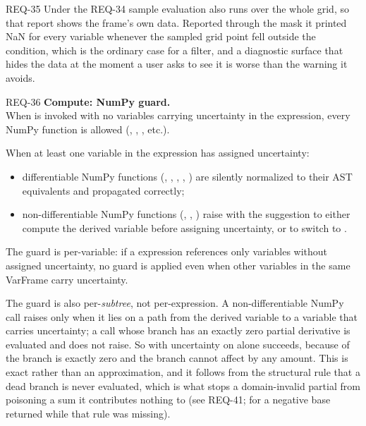 \begin{reqbox}{REQ-35}{\stable}
Under  the REQ-34 sample evaluation also runs over the
whole grid, so that report shows the frame's own data. Reported through
the mask it printed NaN for every variable whenever the sampled grid
point fell outside the condition, which is the ordinary case for a
filter, and a diagnostic surface that hides the data at the moment a
user asks to see it is worse than the warning it avoids.
\end{reqbox}

\begin{reqbox}{REQ-36}{\stable}
\textbf{Compute: NumPy guard.}\\
When  is invoked with no variables carrying uncertainty in
the expression, every NumPy function is allowed (,
, , etc.).

When at least one variable in the expression has assigned uncertainty:
\begin{itemize}[noitemsep,topsep=2pt]
  \item differentiable NumPy functions (, ,
    , , ) are silently normalized
    to their AST equivalents and propagated correctly;
  \item non-differentiable NumPy functions (, ,
    ) raise  with the
    suggestion to either compute the derived variable before assigning
    uncertainty, or to switch to .
\end{itemize}
The guard is per-variable: if a  expression references only
variables without assigned uncertainty, no guard is applied even when
other variables in the same VarFrame carry uncertainty.

The guard is also per-\emph{subtree}, not per-expression. A
non-differentiable NumPy call raises only when it lies on a path from
the derived variable to a variable that carries uncertainty; a call
whose branch has an exactly zero partial derivative is evaluated and
does not raise. So  with uncertainty on
 alone succeeds, because  of the 
branch is exactly zero and the branch cannot affect  by any
amount. This is exact rather than an approximation, and it follows from
the structural rule that a dead branch is never evaluated, which is what
stops a domain-invalid partial from poisoning a sum it contributes
nothing to (see REQ-41;  for a negative base returned
 while that rule was missing).


\end{reqbox}
